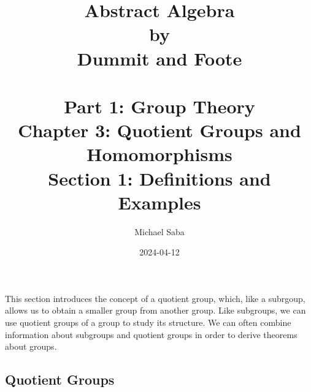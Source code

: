 \documentclass[12pt]{article}
\title{%
    \Huge Abstract Algebra \\
    \large by \\
    \Large Dummit and Foote \\~\\
    \huge Part 1: Group Theory \\
    \LARGE Chapter 3: Quotient Groups and Homomorphisms \\
    \Large Section 1: Definitions and Examples
}
\date{2024-04-12}
\author{Michael Saba}
\begin{document}
    \maketitle
    \newpage
    \setlength{\parindent}{0pt}
 
    This section introduces the concept of a quotient group,
    which, like a subrgoup, allows us to obtain a smaller group
    from another group. 
    Like subgroups, we can use quotient groups of a group to study
    its structure.
    We can often combine information about subgroups and quotient
    groups in order to derive theorems about groups. \\

    \subsection*{Quotient Groups}
\end{document}
